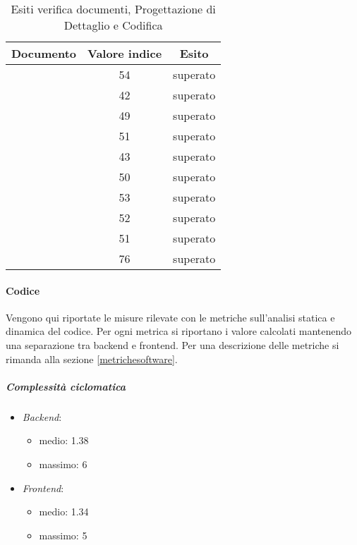 	\begin{table}[H]
	\centering
	\begin{tabular}{ | c | c | c | }
    \hline
    Documento & Valore indice & Esito \\ \hline
    \AnalisiDeiRequisiti{} & 54 & superato  \\ \hline
    \DefinizioneDiProdotto{} & 42 & superato  \\ \hline
    \Glossario{} & 49 & superato  \\ \hline
    \ManualeAdmin{} & 51 & superato  \\ \hline
    \ManualeSviluppatore{} & 43 & superato  \\ \hline
    \ManualeUtente{} & 50 & superato  \\ \hline
    \NormeDiProgetto{} & 53 & superato  \\ \hline
    \PianoDiProgetto{} & 52 & superato  \\ \hline
    \PianoDiQualifica{} & 51 & superato  \\ \hline
    \SpecificaTecnica{} & 76 & superato \\ \hline
    \end{tabular}
	\caption{Esiti verifica documenti, Progettazione di Dettaglio e Codifica}
	\end{table}
	
	\paragraph{Codice}
	Vengono qui riportate le misure rilevate con le metriche sull'analisi statica e dinamica del codice. Per ogni metrica si riportano i valore calcolati mantenendo una separazione tra backend e frontend. Per una descrizione delle metriche si rimanda alla sezione \ref{metrichesoftware}.

	\subparagraph{Complessità ciclomatica}
	\begin{itemize}
		\item \emph{Backend}: 
		\begin{itemize}
			\item medio: 1.38
			\item massimo: 6
		\end{itemize} 
		\item \emph{Frontend}: 
		\begin{itemize}
			\item medio: 1.34
			\item massimo: 5
		\end{itemize} 
	\end{itemize}


